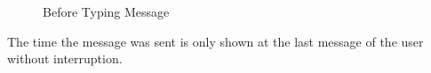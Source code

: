 \begin{figure}[H]
	\centering
	\caption{Before Typing Message}
\end{figure}
The time the message was sent is only shown at the last message of the user without interruption.


